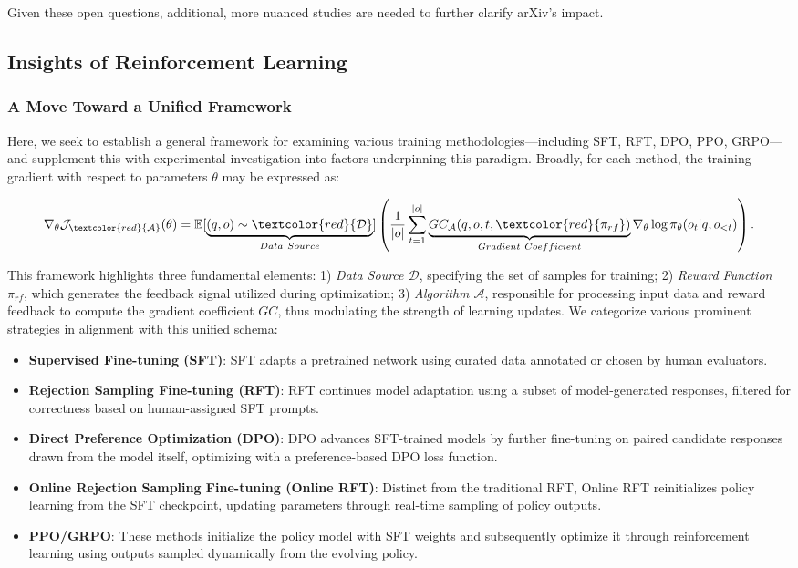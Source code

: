 {Given these open questions, additional, more nuanced studies are needed to further clarify arXiv’s impact.

\subsection{Insights of Reinforcement Learning}
\subsubsection{A Move Toward a Unified Framework} Here, we seek to establish a general framework for examining various training methodologies—including SFT, RFT, DPO, PPO, GRPO—and supplement this with experimental investigation into factors underpinning this paradigm. Broadly, for each method, the training gradient with respect to parameters $\theta$ may be expressed as:

\begin{equation}
    \nabla_{\theta}\mathcal{J}_{\textcolor{red}{\mathcal{A}}}(\theta) = \mathbb{E}[\underbrace{(q,o) \sim \textcolor{red}{\mathcal{D}}}_{Data \ Source}]\left( \frac{1}{|o|} \sum_{t=1}^{|o|}  \underbrace{GC_{{\mathcal{A}}}(q, o, t, \textcolor{red}{\pi_{{rf}}})}_{Gradient \ Coefficient}  \nabla_{\theta}\log \pi_{\theta}(o_t | q, o_{<t})\right).
\label{eq:objective}
\end{equation}

This framework highlights three fundamental elements: 1) \textit{Data Source $\mathcal{D}$}, specifying the set of samples for training; 2) \textit{Reward Function $\pi_{{rf}}$}, which generates the feedback signal utilized during optimization; 3) \textit{Algorithm $\mathcal{A}$}, responsible for processing input data and reward feedback to compute the gradient coefficient $GC$, thus modulating the strength of learning updates. We categorize various prominent strategies in alignment with this unified schema:

\begin{itemize}
    \item  \textbf{Supervised Fine-tuning (SFT)}: SFT adapts a pretrained network using curated data annotated or chosen by human evaluators.
    \item \textbf{Rejection Sampling Fine-tuning (RFT)}: RFT continues model adaptation using a subset of model-generated responses, filtered for correctness based on human-assigned SFT prompts.
    \item \textbf{Direct Preference Optimization (DPO)}: DPO advances SFT-trained models by further fine-tuning on paired candidate responses drawn from the model itself, optimizing with a preference-based DPO loss function.
    \item \textbf{Online Rejection Sampling Fine-tuning (Online RFT)}: Distinct from the traditional RFT, Online RFT reinitializes policy learning from the SFT checkpoint, updating parameters through real-time sampling of policy outputs.
    \item \textbf{PPO/GRPO}: These methods initialize the policy model with SFT weights and subsequently optimize it through reinforcement learning using outputs sampled dynamically from the evolving policy.
\end{itemize}

}
